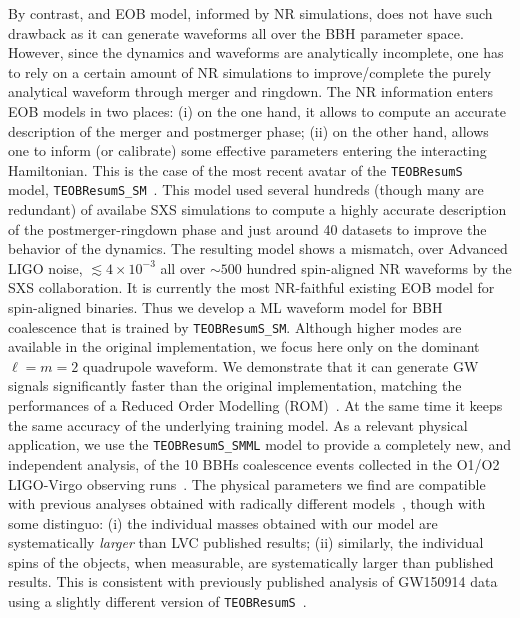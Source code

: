 By contrast, and EOB model, informed by NR simulations, does not have such drawback as it can generate 
waveforms all over the BBH parameter space. However, since the dynamics and waveforms are analytically
incomplete, one has to rely on a certain amount of NR simulations to improve/complete the purely analytical
waveform through merger and ringdown. The NR information enters EOB models in two places: (i) on the one
hand, it allows to compute an accurate description of the merger and postmerger phase; (ii) on the other hand,
allows one to inform (or calibrate) some effective parameters entering the interacting Hamiltonian.
This is the case of the most recent avatar of the \texttt{TEOBResumS}~\cite{Nagar:2018zoe} model, 
\texttt{TEOBResumS\_SM}~\cite{Nagar:2020pcj}. This model used several hundreds (though many are redundant)
of availabe SXS simulations to compute a highly accurate description of the postmerger-ringdown phase
and just around 40 datasets to improve the behavior of the dynamics. The resulting model shows a 
mismatch, over Advanced LIGO noise, $\lesssim 4\times 10^{-3}$ all over $\sim 500$ hundred spin-aligned 
NR waveforms by the SXS collaboration. It is currently the most NR-faithful existing EOB model for spin-aligned 
binaries.
Thus we develop a ML waveform model for BBH coalescence that is trained by \texttt{TEOBResumS\_SM}.
Although higher modes are available in the original implementation, we focus here only on the dominant $\ell=m=2$
quadrupole waveform. We demonstrate that it can generate GW signals significantly faster than 
the original implementation, matching the performances of a Reduced Order Modelling 
(ROM)~\cite{Purrer_2014_ROM,Purrer_2016_FDROM,Boh2017SEOBNRv4}. 
At the same time it keeps the same accuracy of the underlying training model.
As a relevant physical application, we use the \texttt{TEOBResumS\_SMML} model to provide a completely new,
and independent analysis, of the 10 BBHs coalescence events collected in the O1/O2 LIGO-Virgo observing 
runs~\cite{LIGOScientific:2018mvr}. The physical parameters we find are compatible with previous
analyses obtained with radically different models~\cite{LIGOScientific:2018mvr}, though with some distinguo: 
(i) the individual masses obtained with our model are systematically {\it larger} than LVC published results; 
(ii) similarly, the individual spins of the objects, when measurable, are systematically larger than published
results. This is consistent with previously published analysis of GW150914 data using a slightly different version 
of \texttt{TEOBResumS}~\cite{Nagar:2018zoe}.


